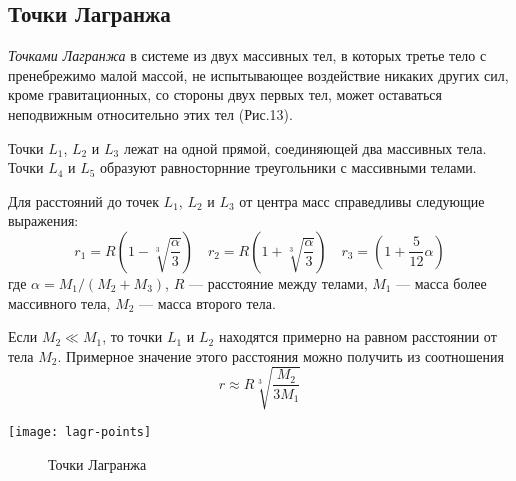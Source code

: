\subsection{Точки Лагранжа}

{\itshape Точками Лагранжа} в системе из двух 
массивных тел, в которых третье тело с пренебрежимо 
малой массой, не испытывающее воздействие никаких 
других сил, кроме гравитационных, со стороны двух 
первых тел, может оставаться неподвижным относительно 
этих тел (Рис.13).

Точки $L_1$, $L_2$ и $L_3$ лежат на одной прямой, 
соединяющей два массивных тела. Точки $L_4$ и $L_5$ 
образуют равносторнние треугольники с массивными 
телами.

Для расстояний до точек $L_1$, $L_2$ и $L_3$ от 
центра масс справедливы следующие выражения:
\begin{equation}r_1=R\left(1-\sqrt[3]{\frac{\alpha}
{3}}\right) \quad r_2=R\left(1+\sqrt[3]{\frac{\alpha}
{3}}\right) \quad r_3=\left(1+\frac{5}{12}\alpha\right)
\end{equation}
где $\alpha=M_1/(M_2+M_3)$, $R$ --- расстояние между 
телами, $M_1$ --- масса более массивного тела, $M_2$
 --- масса второго тела.

Если $M_2\ll M_1$, то точки $L_1$ и $L_2$ находятся 
примерно на равном расстоянии от тела $M_2$. 
Примерное значение этого расстояния можно получить
из соотношения
\begin{equation}r\approx R\sqrt[3]{\frac{M_2}{3M_1}}
\end{equation}
\begin{center}
\texttt{[image: lagr-points]}
\begin{figure}[h!]
\caption{Точки Лагранжа}
\end{figure}
\end{center}